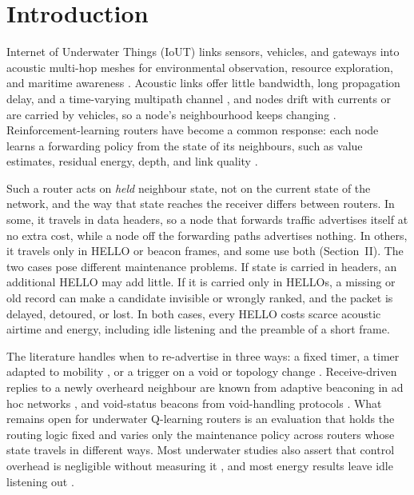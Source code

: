 \section{Introduction}
\label{sec:intro}
 Internet of Underwater Things (IoUT) links sensors, vehicles, and gateways into acoustic multi-hop meshes for environmental observation, resource exploration, and maritime awareness \cite{gupta2024uwsn,gola2023taxonomy,saleem2024ai,jiang2023orsurvey}. Acoustic links offer little bandwidth, long propagation delay, and a time-varying multipath channel \cite{gupta2024uwsn,saleem2024ai,zhu2024trustcomst}, and nodes drift with currents or are carried by vehicles, so a node's neighbourhood keeps changing \cite{gola2023taxonomy,wang2024lgdqn,liu2025mdqn,lu2025wper}. Reinforcement-learning routers have become a common response: each node learns a forwarding policy from the state of its neighbours, such as value estimates, residual energy, depth, and link quality \cite{hu2010qelar,zhang2025saqr,wang2024marv,liu2024clorP,liu2026lqarp}.

Such a router acts on \emph{held} neighbour state, not on the current state of the network, and the way that state reaches the receiver differs between routers. In some, it travels in data headers, so a node that forwards traffic advertises itself at no extra cost, while a node off the forwarding paths advertises nothing. In others, it travels only in HELLO or beacon frames, and some use both (Section~II). The two cases pose different maintenance problems. If state is carried in headers, an additional HELLO may add little. If it is carried only in HELLOs, a missing or old record can make a candidate invisible or wrongly ranked, and the packet is delayed, detoured, or lost. In both cases, every HELLO costs scarce acoustic airtime and energy, including idle listening and the preamble of a short frame.

The literature handles when to re-advertise in three ways: a fixed timer, a timer adapted to mobility \cite{li2025qlar,chen2013apu,zhu2021mobnd}, or a trigger on a void or topology change \cite{ghoreyshi2017void,li2023lrnmp}. Receive-driven replies to a newly overheard neighbour are known from adaptive beaconing in ad hoc networks \cite{chen2013apu}, and void-status beacons from void-handling protocols \cite{ghoreyshi2017void}. What remains open for underwater Q-learning routers is an evaluation that holds the routing logic fixed and varies only the maintenance policy across routers whose state travels in different ways. Most underwater studies also assert that control overhead is negligible without measuring it \cite{zhu2022roeva,zhao2023mlrs,guan2019dvor}, and most energy results leave idle listening out \cite{zhu2022roeva,zhao2023mlrs,li2023lrnmp}.

